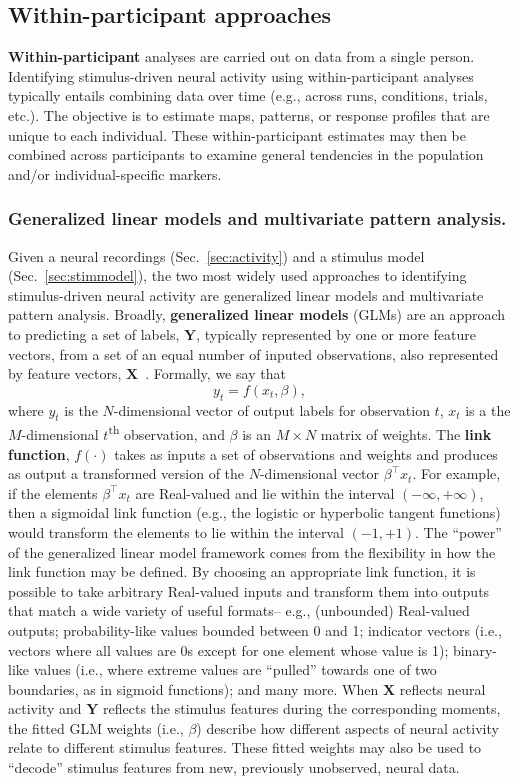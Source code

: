 \documentclass[runningheads]{llncs}
\begin{document}
\subsection{Within-participant approaches}
\textbf{Within-participant} analyses are carried out on data from a
single person.  Identifying stimulus-driven neural activity using
within-participant analyses typically entails combining data over time
(e.g., across runs, conditions, trials, etc.).  The objective is to
estimate maps, patterns, or response profiles that are unique to each
individual.  These within-participant estimates may then be combined
across participants to examine general tendencies in the population and/or
individual-specific markers.

\subsubsection{Generalized linear models and multivariate pattern
  analysis.}

Given a neural recordings (Sec.~\ref{sec:activity}) and a stimulus
model (Sec.~\ref{sec:stimmodel}), the two most widely used approaches
to identifying stimulus-driven neural activity are generalized linear
models and multivariate pattern analysis.  Broadly,
\textbf{generalized linear models} (GLMs) are an approach to
predicting a set of labels, $\mathbf{Y}$, typically represented by one
or more feature vectors, from a set of an equal number of inputed
observations, also represented by feature vectors,
$\mathbf{X}$~\citep{NeldWedd72}.  Formally, we say that
\[
y_t = f\left(x_t, \beta\right),
\]
where $y_t$ is the $N$-dimensional vector of output labels for
observation $t$, $x_t$ is a the $M$-dimensional
$t$\textsuperscript{th} observation, and $\beta$ is an $M \times N$
matrix of weights.  The \textbf{link function}, $f(\cdot)$ takes as
inputs a set of observations and weights and produces as output a
transformed version of the $N$-dimensional vector $\beta^\top x_t$.
For example, if the elements $\beta^\top x_t$ are Real-valued and lie
within the interval $(-\infty, +\infty)$, then a sigmoidal link
function (e.g., the logistic or hyperbolic tangent functions) would
transform the elements to lie within the interval $(-1, +1)$.  The
``power'' of the generalized linear model framework comes from the
flexibility in how the link function may be defined.  By choosing an
appropriate link function, it is possible to take arbitrary
Real-valued inputs and transform them into outputs that match a wide
variety of useful formats-- e.g., (unbounded) Real-valued outputs;
probability-like values bounded between 0 and 1; indicator vectors
(i.e., vectors where all values are 0s except for one element whose
value is 1); binary-like values (i.e., where extreme values are
``pulled'' towards one of two boundaries, as in sigmoid functions);
and many more.  When $\mathbf{X}$ reflects neural activity and
$\mathbf{Y}$ reflects the stimulus features during the corresponding
moments, the fitted GLM weights (i.e., $\beta$) describe how different
aspects of neural activity relate to different stimulus features.
These fitted weights may also be used to ``decode'' stimulus features
from new, previously unobserved, neural data.
\end{document}
